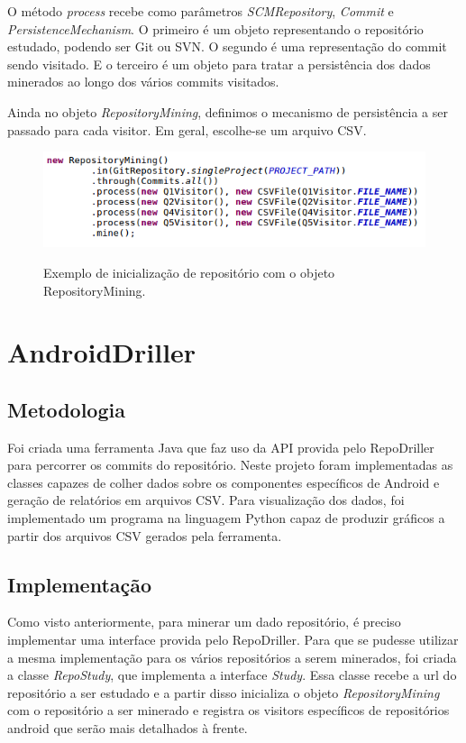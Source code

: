 \documentclass[a4paper,12pt]{article}
\numberwithin{figure}{section}
\begin{document}
O método \textit{process} recebe como parâmetros \textit{SCMRepository}, \textit{Commit} e \textit{PersistenceMechanism}. O primeiro é um objeto representando o repositório estudado, podendo ser Git ou SVN. O segundo é uma representação do commit sendo visitado. E o terceiro é um objeto para tratar a persistência dos dados minerados ao longo dos vários commits visitados.

Ainda no objeto \textit{RepositoryMining}, definimos o mecanismo de persistência a ser passado para cada visitor. Em geral, escolhe-se um arquivo CSV.

 \begin{figure}[h]
 \centering
 \includegraphics[width=\linewidth]{imgs/repodrillerEx.png}
 \label{fig:repodrillerEx}
 \caption{Exemplo de inicialização de repositório com o objeto RepositoryMining.}
 \end{figure}




\newpage
\section{AndroidDriller}%

\subsection{Metodologia}

Foi criada uma ferramenta Java que faz uso da API provida pelo RepoDriller para
percorrer os commits do repositório. Neste projeto foram implementadas as
classes capazes de colher dados sobre os componentes específicos de Android e
geração de relatórios em arquivos CSV. Para visualização dos dados, foi
implementado um programa na linguagem Python capaz de produzir gráficos a
partir dos arquivos CSV gerados pela ferramenta.\\

\subsection{Implementação}%
Como visto anteriormente, para minerar um dado repositório, é preciso implementar uma interface provida pelo RepoDriller. Para que se pudesse utilizar a mesma implementação para os vários repositórios a serem minerados, foi criada a classe \textit{RepoStudy}, que implementa a interface \textit{Study}. Essa classe recebe a url do repositório a ser estudado e a partir disso inicializa o objeto \textit{RepositoryMining} com o repositório a ser minerado e registra os visitors específicos de repositórios android que serão mais detalhados à frente.
\end{document}

